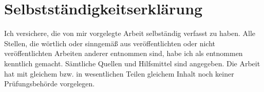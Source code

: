 \section{Selbstständigkeitserklärung}
Ich versichere, die von mir vorgelegte Arbeit selbständig verfasst zu haben. Alle
Stellen, die wörtlich oder sinngemäß aus veröffentlichten oder nicht veröffentlichten
Arbeiten anderer entnommen sind, habe ich als entnommen kenntlich gemacht.
Sämtliche Quellen und Hilfsmittel sind angegeben. Die Arbeit hat mit gleichem bzw.
in wesentlichen Teilen gleichem Inhalt noch keiner Prüfungsbehörde vorgelegen.

\vfill


